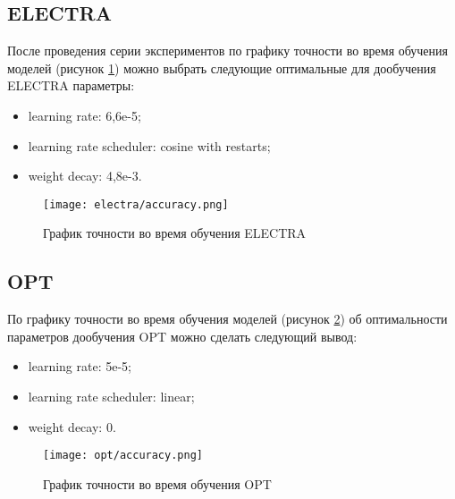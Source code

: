 \subsection{ELECTRA}
После проведения серии экспериментов по графику точности во время обучения моделей (рисунок \ref{electra-accuracy:image}) можно выбрать следующие 
оптимальные для дообучения ELECTRA параметры:
\begin{itemize}
    \item learning rate: 6,6e-5;
    \item learning rate scheduler: cosine with restarts;
    \item weight decay: 4,8e-3.
\end{itemize}
\begin{figure}[H]
    \begin{center}
       \texttt{[image: electra/accuracy.png]}
       \caption{График точности во время обучения ELECTRA}
       \label{electra-accuracy:image}
    \end{center}
\end{figure}

\subsection{OPT}
По графику точности во время обучения моделей (рисунок \ref{opt-accuracy:image}) об оптимальности параметров дообучения OPT можно сделать 
следующий вывод:
\begin{itemize}
    \item learning rate: 5e-5;
    \item learning rate scheduler: linear;
    \item weight decay: 0.
\end{itemize}
\begin{figure}[H]
    \begin{center}
       \texttt{[image: opt/accuracy.png]}
       \caption{График точности во время обучения OPT}
       \label{opt-accuracy:image}
    \end{center}
\end{figure}